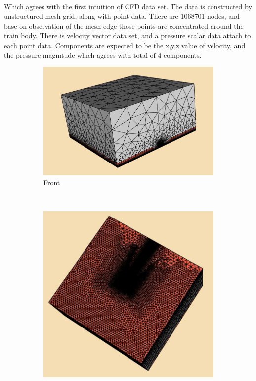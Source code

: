 \documentclass[
	12pt, %
]{fphw}
\begin{document}
\begin{enumerate}[(\itshape 1\normalfont)]
\begin{tabular}{l l l l}
			\bottomrule
		\end{tabular}\\
Which agrees with the first intuition of CFD data set. The data is constructed by unstructured mesh grid, along with point data. There are 1068701 nodes, and base on observation of the mesh edge those points are concentrated around the train body. There is velocity vector data set, and a pressure scalar data attach to each point data. Components are expected to be the x,y,z value of velocity, and the pressure magnitude which agrees with total of 4 components.\\
\begin{figure}[h]
    \centering
    \begin{subfigure}[h]{0.3\textwidth}
        \includegraphics[width=\textwidth]{1a.jpg}
        \caption{Front}
        \label{fig:1c1}
    \end{subfigure}
    ~ 
    \begin{subfigure}[h]{0.2\textwidth}
        \includegraphics[width=\textwidth]{1b.jpg}

\end{subfigure}
\end{figure}
\end{enumerate}
\end{document}
